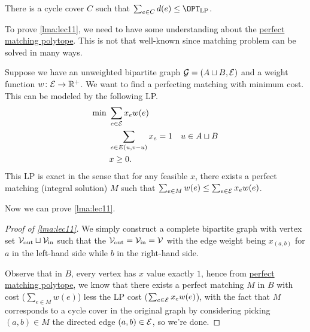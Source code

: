 \begin{lemma}\label{lma:lec11}
	There is a cycle cover \(C\) such that \(\sum_{e\in C} d(e) \leq \OPT_{\mathrm{LP} }\).
\end{lemma}

To prove \autoref{lma:lec11}, we need to have some understanding about the \hyperref[rmk:perfect-matching-polytope]{perfect matching polytope}. This is not that well-known since matching problem can be solved in many ways.

\begin{remark}\label{rmk:perfect-matching-polytope}
	Suppose we have an unweighted bipartite graph \(\mathcal{\MakeUppercase{g}} =(A \sqcup B, \mathcal{\MakeUppercase{e}} )\) and a weight function \(w\colon \mathcal{\MakeUppercase{e}} \to \mathbb{\MakeUppercase{r}} ^+\). We want to find a perfecting matching with minimum cost. This can be modeled by the following LP.
	\begin{align*}
		\min~ & \sum_{e\in \mathcal{\MakeUppercase{e}} } x_e w(e)                  \\
		      & \sum_{e\in E(u, v-u)} x_e = 1                     & u\in A\sqcup B \\
		      & x\geq 0.
	\end{align*}
	This LP is exact in the sense that for any feasible \(x\), there exists a perfect matching (integral solution) \(M\) such that \(\sum_{e\in M} w(e) \leq \sum_{e\in \mathcal{\MakeUppercase{e}}} x_e w(e)\).
\end{remark}

\vspace*{1em}
Now we can prove \autoref{lma:lec11}.
\begin{proof}[Proof of \autoref{lma:lec11}]
	We simply construct a complete bipartite graph with vertex set \(\mathcal{\MakeUppercase{v}}_{\text{out}} \sqcup \mathcal{\MakeUppercase{v}}_{\text{in} }\) such that the \(\mathcal{\MakeUppercase{v}} _{\text{out} }= \mathcal{\MakeUppercase{v}} _{\text{in} }= \mathcal{\MakeUppercase{v}} \) with the edge weight being \(x_{(a, b)}\) for \(a\) in the left-hand side while \(b\) in the right-hand side.

	Observe that in \(B\), every vertex has \(x\) value exactly \(1\), hence from \hyperref[rmk:perfect-matching-polytope]{perfect matching polytope}, we know that there exists a perfect matching \(M\) in \(B\) with cost (\(\sum_{e\in M} w(e)\)) less the LP cost (\(\sum_{e\in \mathcal{\MakeUppercase{e}} } x_e w(e)\)), with the fact that \(M\) corresponds to a cycle cover in the original graph by considering picking \((a, b)\in M\) the directed edge \((a, b)\in \mathcal{\MakeUppercase{e}} \),  so we're done.
\end{proof}

